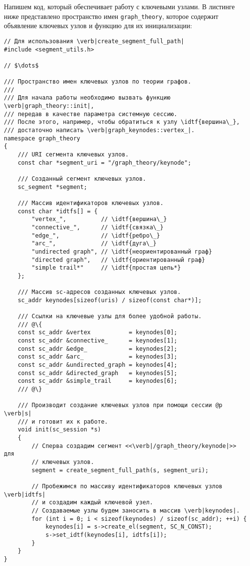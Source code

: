 Напишем код, который обеспечивает работу с ключевыми
узлами. В листинге ниже представлено пространство имен
\lstinline|graph_theory|, которое содержит объявление ключевых узлов и
функцию для их инициализации:
\begin{lstlisting}[texcl]
// Для использования \verb|create_segment_full_path|
#include <segment_utils.h>

// $\dots$

/// Пространство имен ключевых узлов по теории графов.
///
/// Для начала работы необходимо вызвать функцию \verb|graph_theory::init|,
/// передав в качестве параметра системную сессию.
/// После этого, например, чтобы обратиться к узлу \idtf{вершина\_},
/// достаточно написать \verb|graph_keynodes::vertex_|.
namespace graph_theory
{
    /// URI сегмента ключевых узлов.
    const char *segment_uri = "/graph_theory/keynode";

    /// Созданный сегмент ключевых узлов.
    sc_segment *segment;

    /// Массив идентификаторов ключевых узлов.
    const char *idtfs[] = {
        "vertex_",          // \idtf{вершина\_}
        "connective_",      // \idtf{связка\_}
        "edge_",            // \idtf{ребро\_}
        "arc_",             // \idtf{дуга\_}
        "undirected graph", // \idtf{неориентированный граф}
        "directed graph",   // \idtf{ориентированный граф}
        "simple trail*"     // \idtf{простая цепь*}
    };

    /// Массив sc-адресов созданных ключевых узлов.
    sc_addr keynodes[sizeof(uris) / sizeof(const char*)];

    /// Ссылки на ключевые узлы для более удобной работы.
    /// @\{
    const sc_addr &vertex           = keynodes[0];
    const sc_addr &connective_      = keynodes[1];
    const sc_addr &edge_            = keynodes[2];
    const sc_addr &arc_             = keynodes[3];
    const sc_addr &undirected_graph = keynodes[4];
    const sc_addr &directed_graph   = keynodes[5];
    const sc_addr &simple_trail     = keynodes[6];
    /// @\}

    /// Производит создание ключевых узлов при помощи сессии @p \verb|s|
    /// и готовит их к работе.
    void init(sc_session *s)
    {
        // Сперва создадим сегмент <<\verb|/graph_theory/keynode|>> для
        // ключевых узлов.
        segment = create_segment_full_path(s, segment_uri);

        // Пробежимся по массиву идентификаторов ключевых узлов \verb|idtfs|
        // и создадим каждый ключевой узел.
        // Создаваемые узлы будем заносить в массив \verb|keynodes|.
        for (int i = 0; i < sizeof(keynodes) / sizeof(sc_addr); ++i) {
            keynodes[i] = s->create_el(segment, SC_N_CONST);
            s->set_idtf(keynodes[i], idtfs[i]);
        }
    }
}
\end{lstlisting}

